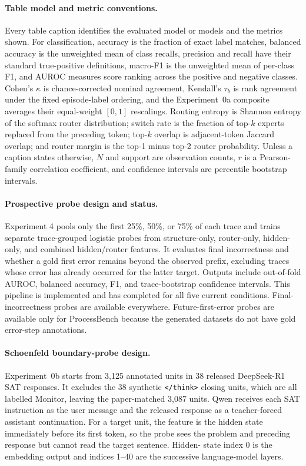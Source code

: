 \documentclass[manuscript,screen,review]{jair}
\begin{document}
\paragraph{Table model and metric conventions.}
Every table caption identifies the evaluated model or models and the metrics
shown.  For classification, accuracy is the fraction of exact label matches,
balanced accuracy is the unweighted mean of class recalls, precision and
recall have their standard true-positive definitions, macro-F1 is the
unweighted mean of per-class F1, and AUROC measures score ranking across the
positive and negative classes.  Cohen's $\kappa$ is chance-corrected nominal
agreement, Kendall's $\tau_b$ is rank agreement under the fixed episode-label
ordering, and the Experiment~0a composite averages their equal-weight
$[0,1]$ rescalings.  Routing entropy is Shannon entropy of the softmax router
distribution; switch rate is the fraction of top-$k$ experts replaced from
the preceding token; top-$k$ overlap is adjacent-token Jaccard overlap; and
router margin is the top-1 minus top-2 router probability.  Unless a caption
states otherwise, $N$ and support are observation counts, $r$ is a Pearson-
family correlation coefficient, and confidence intervals are percentile
bootstrap intervals.

\paragraph{Prospective probe design and status.}
Experiment 4 pools only the first 25\%, 50\%, or 75\% of each trace and trains
separate trace-grouped logistic probes from structure-only, router-only,
hidden-only, and combined hidden/router features.  It evaluates final
incorrectness and whether a gold first error remains beyond the observed
prefix, excluding traces whose error has already occurred for the latter
target.  Outputs include out-of-fold AUROC, balanced accuracy, F1, and
trace-bootstrap confidence intervals.  This pipeline is implemented and
has completed for all five current conditions.  Final-incorrectness probes are
available everywhere.  Future-first-error probes are available only for
ProcessBench because the generated datasets do not have gold error-step
annotations.

\paragraph{Schoenfeld boundary-probe design.}
Experiment~0b starts from 3,125 annotated units in 38 released DeepSeek-R1 SAT
responses.  It excludes the 38 synthetic \texttt{</think>} closing units,
which are all labelled Monitor, leaving the paper-matched 3,087 units.  Qwen
receives each SAT instruction as the user message and the released response as
a teacher-forced assistant continuation.  For a target unit, the feature is
the hidden state immediately before its first token, so the probe sees the
problem and preceding response but cannot read the target sentence.  Hidden-
state index 0 is the embedding output and indices 1--40 are the successive
language-model layers.
\end{document}
